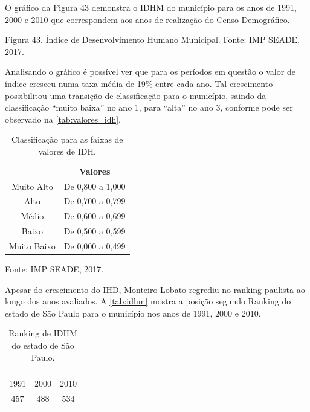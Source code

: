 O gráfico da Figura 43 demonstra o IDHM do município para os anos de 1991, 2000 e 2010 que correspondem aos anos de realização do Censo Demográfico.
 
Figura 43. Índice de Desenvolvimento Humano Municipal.
Fonte: IMP SEADE, 2017.

Analisando o gráfico é possível ver que para os períodos em questão o valor de índice cresceu numa taxa média de 19\% entre cada ano. Tal crescimento possibilitou uma transição de classificação para o município, saindo da classificação “muito baixa” no ano 1, para “alta” no ano 3, conforme pode ser observado na  \autoref{tab:valores_idh}.

\begin{center}
	\begin{table}[htbp]
	\centering
	\caption{Classificação para as faixas de valores de IDH.}
	\begin{tabular}{c|c}
		\rowcolor[rgb]{ .969,  .588,  .275} \multicolumn{1}{c}{\textcolor[rgb]{ 1,  1,  1}{\textbf{Faixas}}} & \textcolor[rgb]{ 1,  1,  1}{\textbf{Valores}} \\
		\rowcolor[rgb]{ .992,  .914,  .851} Muito Alto & De 0,800 a 1,000 \\
		\rowcolor[rgb]{ .984,  .831,  .706} Alto  & De 0,700 a 0,799 \\
		\rowcolor[rgb]{ .992,  .914,  .851} Médio & De 0,600 a 0,699 \\
		\rowcolor[rgb]{ .984,  .831,  .706} Baixo & De 0,500 a 0,599 \\
		\rowcolor[rgb]{ .992,  .914,  .851} Muito Baixo & De 0,000 a 0,499 \\
	\end{tabular}%
	\label{tab:valores_idh}%
\end{table}%
Fonte: IMP SEADE, 2017.
\end{center}

Apesar do crescimento do IHD, Monteiro Lobato regrediu no ranking paulista ao longo dos anos avaliados. A \autoref{tab:idhm} mostra a posição segundo Ranking do estado de São Paulo para o município nos anos de 1991, 2000 e 2010.
 
\begin{table}[htbp]
	\centering
	\caption{Ranking de IDHM do estado de São Paulo.}
	\begin{tabular}{c|c|c}
		\rowcolor[rgb]{ .969,  .588,  .275} \multicolumn{1}{l}{\textcolor[rgb]{ 1,  1,  1}{\textbf{Posição de Monteiro Lobato}}} & \multicolumn{1}{r}{\textcolor[rgb]{ 1,  1,  1}{}} & \textcolor[rgb]{ 1,  1,  1}{} \\
		\rowcolor[rgb]{ .969,  .588,  .275} \multicolumn{3}{c}{\textcolor[rgb]{ 1,  1,  1}{\textbf{Ano}}} \\
		\rowcolor[rgb]{ .984,  .831,  .706} 1991  & 2000  & 2010 \\
		\rowcolor[rgb]{ .992,  .914,  .851} 457   & 488   & 534 \\
	\end{tabular}%
	\label{tab:idhm}%
\end{table}%

